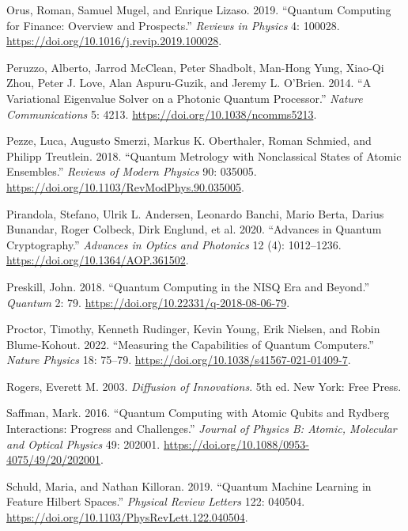 \documentclass[
  11pt,
  letterpaper,
]{article}
\newlength{\cslhangindent}
\newenvironment{CSLReferences}[2] %
 {\begin{list}{}{%
  \setlength{\itemindent}{0pt}
  \setlength{\leftmargin}{0pt}
  \setlength{\parsep}{0pt}
  \ifodd #1
   \setlength{\leftmargin}{\cslhangindent}
   \setlength{\itemindent}{-1\cslhangindent}
  \fi
  \setlength{\itemsep}{#2\baselineskip}}}
 {\end{list}}
\begin{document}
\begin{CSLReferences}{1}{0}
Orus, Roman, Samuel Mugel, and Enrique Lizaso. 2019. {``Quantum
Computing for Finance: Overview and Prospects.''} \emph{Reviews in
Physics} 4: 100028. \url{https://doi.org/10.1016/j.revip.2019.100028}.

Peruzzo, Alberto, Jarrod McClean, Peter Shadbolt, Man-Hong Yung, Xiao-Qi
Zhou, Peter J. Love, Alan Aspuru-Guzik, and Jeremy L. O'Brien. 2014.
{``A Variational Eigenvalue Solver on a Photonic Quantum Processor.''}
\emph{Nature Communications} 5: 4213.
\url{https://doi.org/10.1038/ncomms5213}.

Pezze, Luca, Augusto Smerzi, Markus K. Oberthaler, Roman Schmied, and
Philipp Treutlein. 2018. {``Quantum Metrology with Nonclassical States
of Atomic Ensembles.''} \emph{Reviews of Modern Physics} 90: 035005.
\url{https://doi.org/10.1103/RevModPhys.90.035005}.

Pirandola, Stefano, Ulrik L. Andersen, Leonardo Banchi, Mario Berta,
Darius Bunandar, Roger Colbeck, Dirk Englund, et al. 2020. {``Advances
in Quantum Cryptography.''} \emph{Advances in Optics and Photonics} 12
(4): 1012--1236. \url{https://doi.org/10.1364/AOP.361502}.

Preskill, John. 2018. {``Quantum Computing in the NISQ Era and
Beyond.''} \emph{Quantum} 2: 79.
\url{https://doi.org/10.22331/q-2018-08-06-79}.

Proctor, Timothy, Kenneth Rudinger, Kevin Young, Erik Nielsen, and Robin
Blume-Kohout. 2022. {``Measuring the Capabilities of Quantum
Computers.''} \emph{Nature Physics} 18: 75--79.
\url{https://doi.org/10.1038/s41567-021-01409-7}.

Rogers, Everett M. 2003. \emph{Diffusion of Innovations}. 5th ed. New
York: Free Press.

Saffman, Mark. 2016. {``Quantum Computing with Atomic Qubits and Rydberg
Interactions: Progress and Challenges.''} \emph{Journal of Physics B:
Atomic, Molecular and Optical Physics} 49: 202001.
\url{https://doi.org/10.1088/0953-4075/49/20/202001}.

Schuld, Maria, and Nathan Killoran. 2019. {``Quantum Machine Learning in
Feature Hilbert Spaces.''} \emph{Physical Review Letters} 122: 040504.
\url{https://doi.org/10.1103/PhysRevLett.122.040504}.


\end{CSLReferences}
\end{document}
